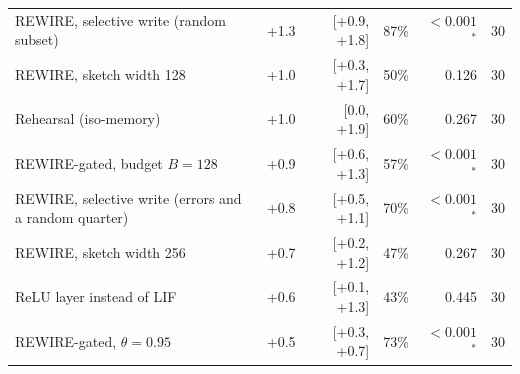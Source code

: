 \begin{tabular*}{\textwidth}{@{\extracolsep{\fill}}lrrrrr@{}}
REWIRE, selective write (random subset) & +1.3 & [+0.9, +1.8] & 87\% & $<0.001$$^{*}$ & 30 \\
REWIRE, sketch width 128 & +1.0 & [+0.3, +1.7] & 50\% & 0.126 & 30 \\
Rehearsal (iso-memory) & +1.0 & [0.0, +1.9] & 60\% & 0.267 & 30 \\
REWIRE-gated, budget $B=128$ & +0.9 & [+0.6, +1.3] & 57\% & $<0.001$$^{*}$ & 30 \\
REWIRE, selective write (errors and a random quarter) & +0.8 & [+0.5, +1.1] & 70\% & $<0.001$$^{*}$ & 30 \\
REWIRE, sketch width 256 & +0.7 & [+0.2, +1.2] & 47\% & 0.267 & 30 \\
ReLU layer instead of LIF & +0.6 & [+0.1, +1.3] & 43\% & 0.445 & 30 \\
REWIRE-gated, $\theta=0.95$ & +0.5 & [+0.3, +0.7] & 73\% & $<0.001$$^{*}$ & 30 \\
\bottomrule
\end{tabular*}
